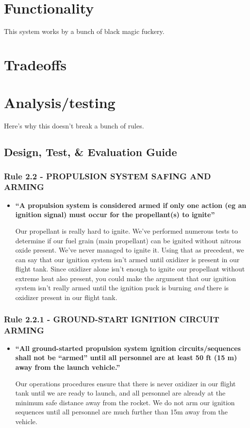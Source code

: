 \documentclass[letter]{article}
\begin{document}

\section{Functionality}

This system works by a bunch of black magic fuckery.

\section{Tradeoffs}

\section{Analysis/testing}
Here's why this doesn't break a bunch of rules.

\subsection{Design, Test, \& Evaluation Guide}
\subsubsection{Rule 2.2 - PROPULSION SYSTEM SAFING AND ARMING}
\begin{itemize}
\item {\bfseries ``A propulsion system is considered armed if only one action 
(eg an ignition signal) must occur for the propellant(s) to ignite''}

Our propellant is really hard to ignite. We've performed numerous tests to determine
if our fuel grain (main propellant) can be ignited without nitrous oxide present.
We've never managed to ignite it. Using that as precedent, we can say
that our ignition system isn't armed until oxidizer is present in our flight tank.
Since oxidizer alone isn't enough to ignite our propellant without extreme heat also
present, you could make the argument that our ignition system isn't really armed until
the ignition puck is burning \textit{and} there is oxidizer present in our flight tank.
\end{itemize}
\subsubsection{Rule 2.2.1 - GROUND-START IGNITION CIRCUIT ARMING}
\begin{itemize}
\item {\bfseries ``All ground-started propulsion system ignition circuits/sequences shall not be ``armed'' until all personnel are at least
50 ft (15 m) away from the launch vehicle.''}

Our operations procedures ensure that there is never oxidizer in our flight tank
until we are ready to launch, and all personnel are already at the minimum safe
distance away from the rocket. We do not arm our ignition sequences until all
personnel are much further than 15m away from the vehicle.
\end{itemize}
\end{document}
